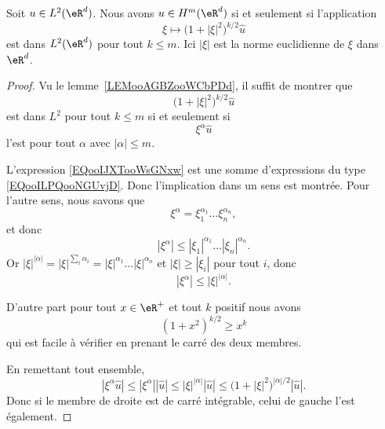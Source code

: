 \begin{lemma}
    Soit \( u\in L^2(\eR^d)\). Nous avons \( u\in H^m(\eR^d)\) si et seulement si l'application
    \begin{equation}
        \xi\mapsto \big( 1+| \xi |^2 \big)^{k/2}\hat u
    \end{equation}
    est dans \( L^2(\eR^d)\) pour tout \( k\leq m\). Ici \( | \xi |\) est la norme euclidienne de \( \xi\) dans \( \eR^d\).
\end{lemma}

\begin{proof}
    Vu le lemme~\ref{LEMooAGBZooWCbPDd}, il suffit de montrer que
    \begin{equation}        \label{EQooIJXTooWsGNxw}
        \big( 1+| \xi |^2 \big)^{k/2}\hat u
    \end{equation}
    est dans \( L^2\) pour tout \( k\leq m\) si et seulement si
    \begin{equation}        \label{EQooILPQooNGUvjD}
        \xi^{\alpha}\hat u
    \end{equation}
    l'est pour tout \( \alpha\) avec \( | \alpha |\leq m\).

    L'expression \eqref{EQooIJXTooWsGNxw} est une somme d'expressions du type \eqref{EQooILPQooNGUvjD}. Donc l'implication dans un sens est montrée. Pour l'autre sens, nous savons que
    \begin{equation}
        \xi^{\alpha}=\xi_1^{\alpha_1}\ldots \xi_n^{\alpha_n},
    \end{equation}
    et donc
    \begin{equation}
        | \xi^{\alpha} |\leq | \xi_1 |^{\alpha_1}\ldots | \xi_n |^{\alpha_n}.
    \end{equation}
    Or \( | \xi |^{| \alpha |}=| \xi |^{\sum_i\alpha_i}=| \xi |^{\alpha_1}\ldots | \xi |^{\alpha_n}\) et \( | \xi |\geq | \xi_i |\) pour tout \( i\), donc
    \begin{equation}
        | \xi^{\alpha} |\leq | \xi |^{| \alpha |}.
    \end{equation}

    D'autre part pour tout \( x\in \eR^+\) et tout \( k\) positif nous avons
    \begin{equation}
        (1+x^2)^{k/2}\geq x^k
    \end{equation}
    qui est facile à vérifier en prenant le carré des deux membres.

    En remettant tout ensemble,
    \begin{equation}
        | \xi^{\alpha}\hat u |\leq | \xi^{\alpha} | |\hat u |\leq | \xi |^{| \alpha |}| \hat u |\leq \big( 1+| \xi |^2 \big)^{| \alpha |/2}| \hat u |.
    \end{equation}
    Donc si le membre de droite est de carré intégrable, celui de gauche l'est également.
\end{proof}

